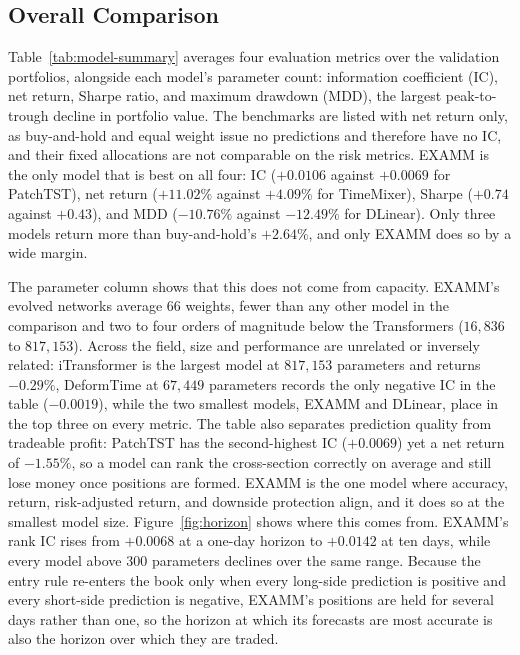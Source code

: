 \subsection{Overall Comparison}
Table~\ref{tab:model-summary} averages four evaluation metrics over the validation portfolios, alongside each model's parameter count: information coefficient (IC), net return, Sharpe ratio, and maximum drawdown (MDD), the largest peak-to-trough decline in portfolio value. The benchmarks are listed with net return only, as buy-and-hold and equal weight issue no predictions and therefore have no IC, and their fixed allocations are not comparable on the risk metrics. EXAMM is the only model that is best on all four: IC ($+0.0106$ against $+0.0069$ for PatchTST), net return ($+11.02\%$ against $+4.09\%$ for TimeMixer), Sharpe ($+0.74$ against $+0.43$), and MDD ($-10.76\%$ against $-12.49\%$ for DLinear). Only three models return more than buy-and-hold's $+2.64\%$, and only EXAMM does so by a wide margin.

The parameter column shows that this does not come from capacity. EXAMM's evolved networks average $66$ weights, fewer than any other model in the comparison and two to four orders of magnitude below the Transformers ($16{,}836$ to $817{,}153$). Across the field, size and performance are unrelated or inversely related: iTransformer is the largest model at $817{,}153$ parameters and returns $-0.29\%$, DeformTime at $67{,}449$ parameters records the only negative IC in the table ($-0.0019$), while the two smallest models, EXAMM and DLinear, place in the top three on every metric. The table also separates prediction quality from tradeable profit: PatchTST has the second-highest IC ($+0.0069$) yet a net return of $-1.55\%$, so a model can rank the cross-section correctly on average and still lose money once positions are formed. EXAMM is the one model where accuracy, return, risk-adjusted return, and downside protection align, and it does so at the smallest model size. Figure~\ref{fig:horizon} shows where this comes from. EXAMM's rank IC rises from $+0.0068$
at a one-day horizon to $+0.0142$ at ten days, while every model above $300$ parameters
declines over the same range. Because the entry rule re-enters the book only when every
long-side prediction is positive and every short-side prediction is negative, EXAMM's
positions are held for several days rather than one, so the horizon at which its forecasts
are most accurate is also the horizon over which they are traded.




